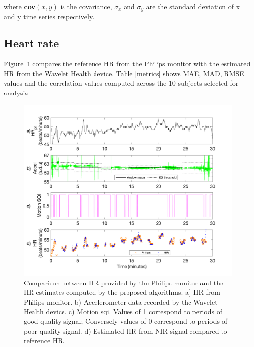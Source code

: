 where $\mathbf{cov}(x, y)$ is the covariance, $\sigma_{x}$ and $\sigma_{y}$ are the standard deviation of x and y time series respectively. 
  
 \subsection{Heart rate}
 
 Figure~\ref{HRseries} compares the reference HR from the Philips monitor with the estimated HR from the Wavelet Health device. Table \ref{metrics} shows MAE, MAD, RMSE values and the correlation values computed across the 10 subjects selected for analysis. 


\begin{figure}
\centering
\includegraphics[width = 12 cm]{./figures/HR_Series_003.png}
    \caption[Comparison between HR provided by the Philips monitor and the HR estimates computed by the proposed algorithms.]{Comparison between HR provided by the Philips monitor and the HR estimates computed by the proposed algorithms. a) HR from Philips monitor. b) Accelerometer data recorded by the Wavelet Health device. c) Motion \gls{sqi}. Values of 1 correspond to periods of good-quality signal; Conversely values of 0 correspond to periods of poor quality signal. d) Estimated HR from NIR signal compared to reference HR.}
    \label{HRseries}
    \end{figure}

